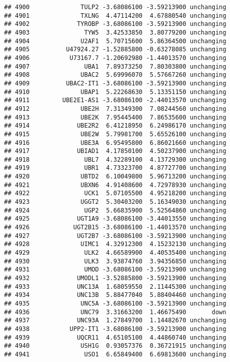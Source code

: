 \documentclass[]{article}
\begin{document}
\begin{verbatim}
## 4900              TULP2 -3.68086100 -3.59213900 unchanging
## 4901              TXLNG  4.47114200  4.67880540 unchanging
## 4902             TYROBP -3.68086100 -3.59213900 unchanging
## 4903               TYW5  3.42533850  3.80779200 unchanging
## 4904              U2AF1  5.70715600  5.86364500 unchanging
## 4905          U47924.27 -1.52885800 -0.63278085 unchanging
## 4906           U73167.7 -1.20692980 -1.44013570 unchanging
## 4907               UBA1  7.89373250  7.80303800 unchanging
## 4908              UBAC2  5.69996070  5.57667260 unchanging
## 4909          UBAC2-IT1 -3.68086100 -3.59213900 unchanging
## 4910              UBAP1  5.22268630  5.13351150 unchanging
## 4911         UBE2E1-AS1 -3.68086100 -2.44013570 unchanging
## 4912              UBE2H  7.31349300  7.08244560 unchanging
## 4913              UBE2K  7.95445400  7.86535600 unchanging
## 4914             UBE2R2  6.41218950  6.24986170 unchanging
## 4915              UBE2W  5.79981700  5.65526100 unchanging
## 4916              UBE3A  6.95495800  6.86021660 unchanging
## 4917             UBIAD1  4.17850100  4.50237900 unchanging
## 4918               UBL7  4.32289100  4.13729300 unchanging
## 4919               UBR1  4.73323700  4.87727700 unchanging
## 4920              UBTD2  6.10049800  5.96713200 unchanging
## 4921              UBXN6  4.91408600  4.72978930 unchanging
## 4922               UCK1  5.07105500  4.95218200 unchanging
## 4923              UGGT2  5.30403200  5.16349030 unchanging
## 4924               UGP2  5.66835900  5.52564860 unchanging
## 4925             UGT1A9 -3.68086100 -3.44013550 unchanging
## 4926            UGT2B15 -3.68086100 -1.44013570 unchanging
## 4927             UGT2B7 -3.68086100 -3.59213900 unchanging
## 4928              UIMC1  4.32912300  4.15232130 unchanging
## 4929               ULK2  4.66589900  4.40535400 unchanging
## 4930               ULK3  3.93874760  3.94356850 unchanging
## 4931               UMOD -3.68086100 -3.59213900 unchanging
## 4932             UMODL1 -3.52885800 -3.59213900 unchanging
## 4933             UNC13A  1.68059550  2.11445300 unchanging
## 4934             UNC13B  5.88477040  5.88404460 unchanging
## 4935              UNC5A -3.68086100 -3.59213900 unchanging
## 4936              UNC79  3.31663200  1.46675490       down
## 4937             UNC93A  1.27849700  1.14482670 unchanging
## 4938           UPP2-IT1 -3.68086100 -3.59213900 unchanging
## 4939             UQCR11  4.65105100  4.44860740 unchanging
## 4940              USH1G  0.93057376  0.36721915 unchanging
## 4941               USO1  6.65849400  6.69813600 unchanging

\end{verbatim}
\end{document}

